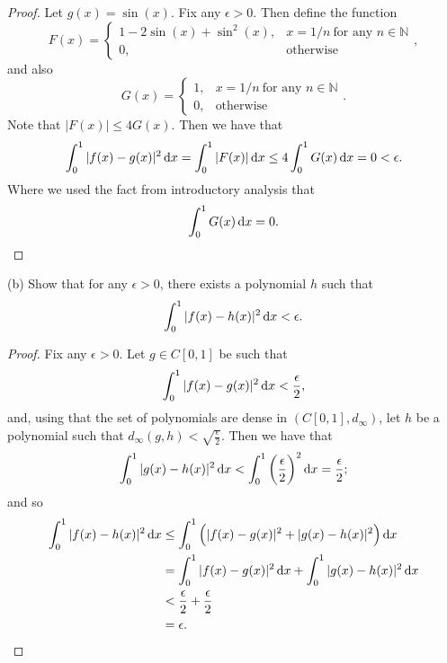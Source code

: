 \documentclass{article}
\newcommand{\N}{\mathbb{N}}
\begin{document}
\begin{proof}

Let $g(x) = \sin(x)$. Fix any $\epsilon > 0$. Then define the function
%
\begin{equation*}
    F(x) =
    \begin{cases}
        1 - 2 \sin(x) + \sin^2(x), & x = 1/n \ \text{for any $n \in \N$} \\
        0, & \text{otherwise}
    \end{cases}
    ,
\end{equation*}
%
and also
%
\begin{equation*}
    G(x) =
    \begin{cases}
        1, & x = 1/n \ \text{for any $n \in \N$} \\
        0, & \text{otherwise}
    \end{cases}
    .
\end{equation*}
%
Note that $|F(x)| \leq 4 G(x)$. Then we have that
%
\begin{align*}
    \int_0^1 |f(x) - g(x)|^2 \dif x
        = \int_0^1 |F(x)| \dif x
        \leq 4 \int_0^1 G(x) \dif x
        = 0
        < \epsilon
        .
\end{align*}
%
Where we used the fact from introductory analysis that
%
\begin{equation*}
    \int_0^1 G(x) \dif x = 0
    .
\end{equation*}

\end{proof}

(b) Show that for any $\epsilon > 0$, there exists a polynomial $h$ such that
%
\begin{equation*}
    \int_0^1 |f(x) - h(x)|^2 \dif x < \epsilon
    .
\end{equation*}

\begin{proof}

Fix any $\epsilon > 0$. Let $g \in C[0, 1]$ be such that
%
\begin{equation*}
    \int_0^1 |f(x) - g(x)|^2 \dif x < \frac{\epsilon}{2}
    ,
\end{equation*}
%
and, using that the set of polynomials are dense in $(C[0, 1],
d_\infty)$, let $h$ be a polynomial such that $d_\infty(g, h) <
\sqrt{\frac{\epsilon}{2}}$. Then we have that
%
\begin{equation*}
    \int_0^1 |g(x) - h(x)|^2 \dif x
        < \int_0^1 \del{\frac{\epsilon}{2}}^2 \dif x
        = \frac{\epsilon}{2}
        ;
\end{equation*}
%
and so
%
\begin{align*}
    \int_0^1 |f(x) - h(x)|^2 \dif x
        &\leq \int_0^1 \del{|f(x) - g(x)|^2 + |g(x) - h(x)|^2} \dif x \\
        &= \int_0^1 |f(x) - g(x)|^2 \dif x + \int_0^1 |g(x) - h(x)|^2 \dif x \\
        &< \frac{\epsilon}{2} + \frac{\epsilon}{2} \\
        &= \epsilon
        .
\end{align*}

\end{proof}
\end{document}
